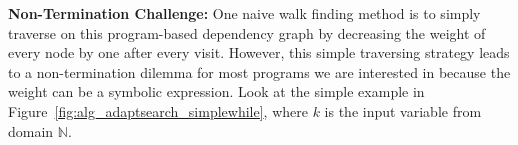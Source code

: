  \textbf{Non-Termination Challenge:}
 One naive walk finding method is to simply traverse on this program-based dependency graph by decreasing the weight of every node by one after every visit. However, this simple 
 traversing strategy leads to a non-termination dilemma for most programs we are interested in because the weight can be a symbolic expression. 
 Look at the simple example in Figure~\ref{fig:alg_adaptsearch_simplewhile}, where $k$ is the input variable from domain $\mathbb{N}$.

